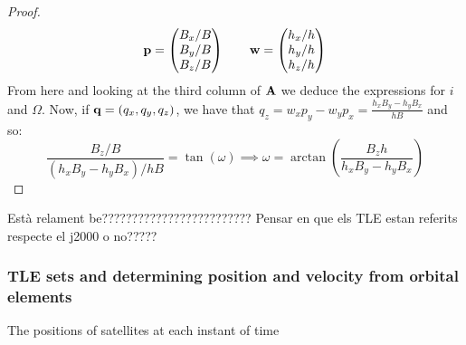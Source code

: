 \documentclass[../main.tex]{subfiles}
\begin{document}
\begin{proof}
  \begin{equation}
    \boldsymbol{\mathrm{p}}=\begin{pmatrix}
      B_x/B \\
      B_y/B \\
      B_z/B
    \end{pmatrix}\qquad
    \boldsymbol{\mathrm{w}}=\begin{pmatrix}
      h_x/h \\
      h_y/h \\
      h_z/h
    \end{pmatrix}
  \end{equation}
  From here and looking at the third column of $\boldsymbol{\mathrm{A}}$ we deduce the expressions for $i$ and $\Omega$. Now, if $\boldsymbol{\mathrm{q}}=(q_x, q_y, q_z)$, we have that $q_z=w_x p_y-w_y p_x=\frac{h_x B_y-h_yB_x}{hB}$ and so:
  \begin{equation}
    \frac{B_z/B}{(h_x B_y-h_yB_x)/hB}=\tan(\omega)\implies \omega =\arctan\left(\frac{B_zh}{h_xB_y-h_yB_x}\right)
  \end{equation}
\end{proof}
Està relament be????????????????????????? Pensar en que els TLE estan referits respecte el j2000 o no?????
\subsubsection{TLE sets and determining position and velocity from orbital elements}
The positions of satellites at each instant of time
\end{document}
